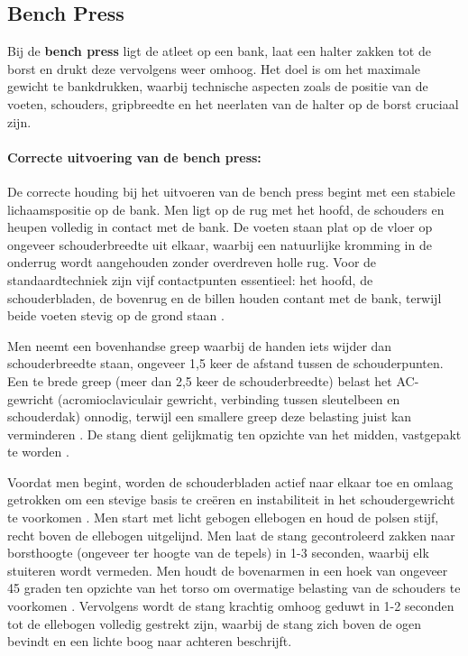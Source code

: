 \subsection{Bench Press}
\label{subsec:bench-press}
Bij de \textbf{bench press} ligt de atleet op een bank, laat een halter zakken tot de borst en drukt deze vervolgens weer omhoog. 
Het doel is om het maximale gewicht te bankdrukken, waarbij technische aspecten zoals de positie van de voeten, schouders, gripbreedte en het neerlaten van de halter op de borst cruciaal zijn.

\paragraph{Correcte uitvoering van de bench press:}
De correcte houding bij het uitvoeren van de bench press begint met een stabiele lichaamspositie op de bank. 
Men ligt op de rug met het hoofd, de schouders en heupen volledig in contact met de bank. 
De voeten staan plat op de vloer op ongeveer schouderbreedte uit elkaar, waarbij een natuurlijke kromming in de onderrug wordt aangehouden zonder overdreven holle rug. 
Voor de standaardtechniek zijn vijf contactpunten essentieel: het hoofd, de schouderbladen, de bovenrug en de billen houden contant met de bank, terwijl beide voeten stevig op de grond staan \autocite{KrolEtAl2010}.

\medskip

Men neemt een bovenhandse greep waarbij de handen iets wijder dan schouderbreedte staan, ongeveer 1,5 keer de afstand tussen de schouderpunten. 
Een te brede greep (meer dan 2,5 keer de schouderbreedte) belast het AC-gewricht (acromioclaviculair gewricht, verbinding tussen sleutelbeen en schouderdak) onnodig, terwijl een smallere greep deze belasting juist kan verminderen \autocite{Ronai2018}. 
De stang dient gelijkmatig ten opzichte van het midden, vastgepakt te worden \autocite{KrolEtAl2010}.

\medskip

Voordat men begint, worden de schouderbladen actief naar elkaar toe en omlaag getrokken om een stevige basis te creëren en instabiliteit in het schoudergewricht te voorkomen \autocite{NoteboomEtAl2024}. 
Men start met licht gebogen ellebogen en houd de polsen stijf, recht boven de ellebogen uitgelijnd. 
Men laat de stang gecontroleerd zakken naar borsthoogte (ongeveer ter hoogte van de tepels) in 1-3 seconden, waarbij elk stuiteren wordt vermeden. 
Men houdt de bovenarmen in een hoek van ongeveer 45 graden ten opzichte van het torso om overmatige belasting van de schouders te voorkomen \autocite{Ronai2018}. 
Vervolgens wordt de stang krachtig omhoog geduwt in 1-2 seconden tot de ellebogen volledig gestrekt zijn, waarbij de stang zich boven de ogen bevindt en een lichte boog naar achteren beschrijft.

